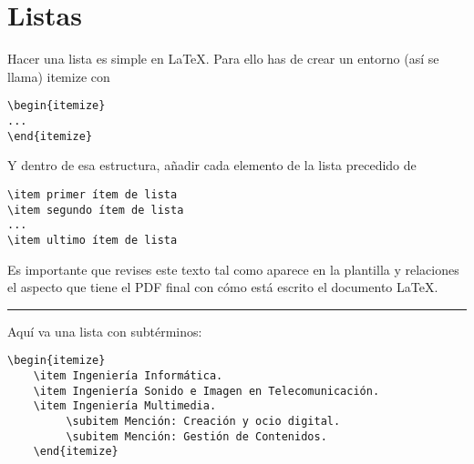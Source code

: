 \section{Listas}
Hacer una lista es simple en \LaTeX. Para ello has de crear un entorno (así se llama) itemize con
\begin{lstlisting}[style=Latex-color]
\begin{itemize}
...
\end{itemize}
\end{lstlisting}
Y dentro de esa estructura, añadir cada elemento de la lista precedido de 
\begin{lstlisting}[style=Latex-color]
\item primer ítem de lista
\item segundo ítem de lista
...
\item ultimo ítem de lista
\end{lstlisting}

Es importante que revises este texto tal como aparece en la plantilla y relaciones el aspecto que tiene el PDF final con cómo está escrito el documento \LaTeX.
\vspace{1em}
\noindent\hrule
\vspace{1em}

Aquí va una lista con subtérminos:
\begin{lstlisting}[style=Latex-color]
	\begin{itemize}
    \item Ingeniería Informática.
    \item Ingeniería Sonido e Imagen en Telecomunicación.
    \item Ingeniería Multimedia.
         \subitem Mención: Creación y ocio digital.
         \subitem Mención: Gestión de Contenidos.
	\end{itemize}
\end{lstlisting}

